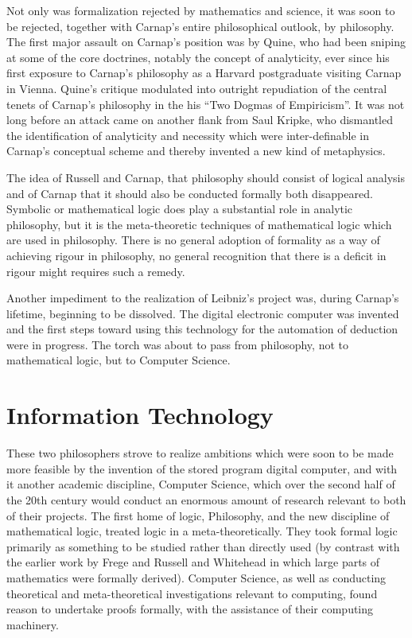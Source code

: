 Not only was formalization rejected by mathematics and science, it was
soon to be rejected, together with Carnap's entire philosophical
outlook, by philosophy. 
The first major assault on Carnap's position was by Quine, who had
been sniping at some of the core doctrines, notably the concept of
analyticity, ever since his first exposure to Carnap's philosophy as a
Harvard postgraduate visiting Carnap in Vienna. 
Quine's critique modulated into outright repudiation of the central
tenets of Carnap's philosophy in the his ``Two Dogmas of
Empiricism''. 
It was not long before an attack came on another flank from Saul
Kripke, who dismantled the identification of analyticity and necessity
which were inter-definable in Carnap's conceptual scheme and thereby
invented a new kind of metaphysics. 

The idea of Russell and Carnap, that philosophy should consist of
logical analysis and of Carnap that it should also be conducted
formally both disappeared. 
Symbolic or mathematical logic does play a substantial role in
analytic philosophy, but it is the meta-theoretic techniques of
mathematical logic which are used in philosophy. 
There is no general adoption of formality as a way of achieving rigour
in philosophy, no general recognition that there is a deficit in
rigour might requires such a remedy. 

Another impediment to the realization of Leibniz's project was, during
Carnap's lifetime, beginning to be dissolved. 
The digital electronic computer was invented and the first steps
toward using this technology for the automation of deduction were in
progress. 
The torch was about to pass from philosophy, not to mathematical
logic, but to Computer Science. 

\section{Information Technology}

These two philosophers strove to realize ambitions which were soon to
be made more feasible by the invention of the stored program digital
computer, and with it another academic discipline, Computer Science,
which over the second half of the 20th century would conduct an
enormous amount of research relevant to both of their projects.
The first home of logic, Philosophy, and the new discipline of
mathematical logic, treated logic in a meta-theoretically.
They took formal logic primarily as something to be studied rather
than directly used (by contrast with the earlier work by Frege and
Russell and Whitehead in which large parts of mathematics were
formally derived).
Computer Science, as well as conducting theoretical and
meta-theoretical investigations relevant to computing, found reason to
undertake proofs formally, with the assistance of their computing
machinery.

